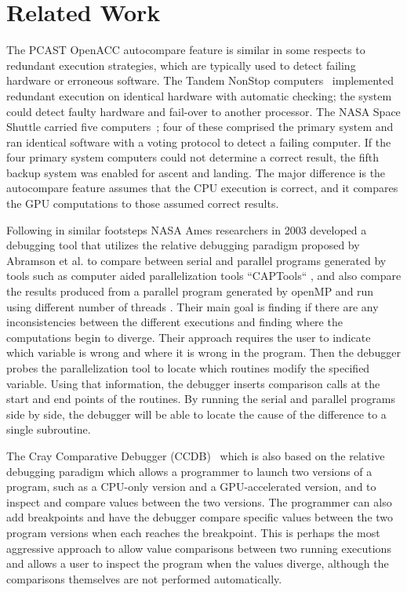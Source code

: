 \section{Related Work}


The PCAST OpenACC autocompare feature is similar in some respects to redundant execution strategies, which are typically used to detect failing hardware or erroneous software.
The Tandem NonStop computers~\cite{bartlett.tandem.86} implemented redundant execution on identical hardware with automatic checking; the system could detect faulty hardware and fail-over to another processor.
The NASA Space Shuttle carried five computers~\cite{fraser.astro.74}; four of these comprised the primary system and ran identical software with a voting protocol to detect a failing computer.
If the four primary system computers could not determine a correct result, the fifth backup system was enabled for ascent and landing.
The major difference is the autocompare feature assumes that the CPU execution is correct, and it compares the GPU computations to those assumed correct results.

Following in similar footsteps NASA Ames researchers in 2003 developed a debugging tool that utilizes the relative debugging paradigm proposed by Abramson et al. \cite{abramson1994relative}\cite{abramson1996relative} to compare between serial and parallel programs generated by tools such as computer aided parallelization tools “CAPTools“ \cite{jost2003relative}, and also compare the results produced from a parallel program generated by openMP and run using different number of threads \cite{matthews2003automatic}. Their main goal is finding if there are any inconsistencies between the different executions and finding where the computations begin to diverge. Their approach requires the user to indicate which variable is wrong and where it is wrong in the program. Then the debugger probes the parallelization tool to locate which routines modify the specified variable. Using that information, the debugger inserts comparison calls at the start and end points of the routines. By running the serial and parallel programs side by side, the debugger will be able to locate the cause of the difference to a single subroutine. 

The Cray Comparative Debugger (CCDB)~\cite{derose.sc.15} which is also based on the relative debugging paradigm which allows a programmer to launch two versions of a program, such as a CPU-only version and a GPU-accelerated version, and to inspect and compare values between the two versions.
The programmer can also add breakpoints and have the debugger compare specific values between the two program versions when each reaches the breakpoint.
This is perhaps the most aggressive approach to allow value comparisons between two running executions and allows a user to inspect the program when the values diverge, although the comparisons themselves are not performed automatically.

